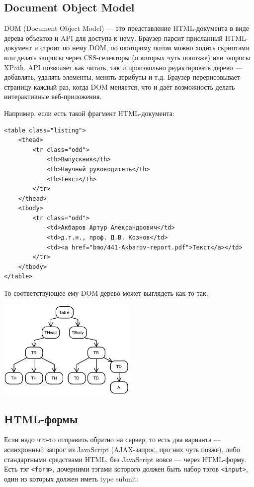 \documentclass{../../text-style}
\begin{document}
\subsection{Document Object Model}

DOM (Document Object Model) --- это представление HTML-документа в виде дерева объектов и API для доступа к нему. Браузер парсит присланный HTML-документ и строит по нему DOM, по окоторому потом можно ходить скриптами или делать запросы через CSS-селекторы (о которых чуть попозже) или запросы XPath. API позволяет как читать, так и произвольно редактировать дерево --- добавлять, удалять элементы, менять атрибуты и т.д. Браузер перерисовывает страницу каждый раз, когда DOM меняется, что и даёт возможность делать интерактивные веб-приложения.

Например, если есть такой фрагмент HTML-документа:

\begin{verbatim}
<table class="listing">
    <thead>
        <tr class="odd">
            <th>Выпускник</th>
            <th>Научный руководитель</th>
            <th>Текст</th>
        </tr>
    </thead>
    <tbody>
        <tr class="odd">
            <td>Акбаров Артур Александрович</td>
            <td>д.т.н., проф. Д.В. Кознов</td>
            <td><a href="bmo/441-Akbarov-report.pdf">Текст</a></td>
        </tr>
    </tbody>
</table>
\end{verbatim}

То соответствующее ему DOM-дерево может выглядеть как-то так:

\begin{center}
    \includegraphics[width=0.5\textwidth]{domTree.png}
\end{center}

\subsection{HTML-формы}

Если надо что-то отправить обратно на сервер, то есть два варианта --- асинхронный запрос из JavaScript (AJAX-запрос, про них чуть позже), либо стандартными средствами HTML, без JavaScript вовсе --- через HTML-форму. Есть тэг \texttt{<form>}, дочерними тэгами которого должен быть набор тэгов \texttt{<input>}, один из которых должен иметь type submit:
\end{document}
